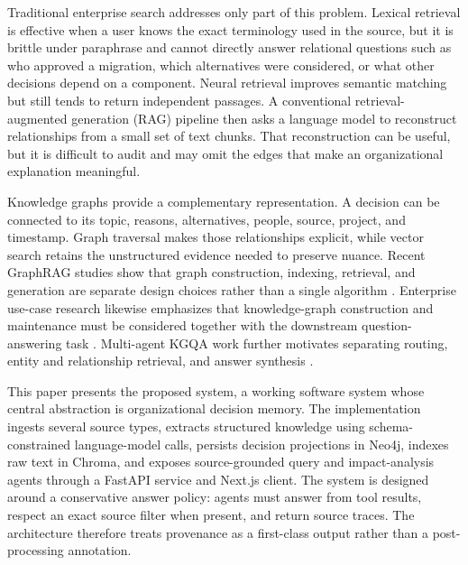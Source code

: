 \documentclass[conference]{IEEEtran}
\newcommand{\system}{the proposed system}
\begin{document}
Traditional enterprise search addresses only part of this problem. Lexical retrieval is effective when a user knows the exact terminology used in the source, but it is brittle under paraphrase and cannot directly answer relational questions such as who approved a migration, which alternatives were considered, or what other decisions depend on a component. Neural retrieval improves semantic matching but still tends to return independent passages. A conventional retrieval-augmented generation (RAG) pipeline then asks a language model to reconstruct relationships from a small set of text chunks. That reconstruction can be useful, but it is difficult to audit and may omit the edges that make an organizational explanation meaningful.

Knowledge graphs provide a complementary representation. A decision can be connected to its topic, reasons, alternatives, people, source, project, and timestamp. Graph traversal makes those relationships explicit, while vector search retains the unstructured evidence needed to preserve nuance. Recent GraphRAG studies show that graph construction, indexing, retrieval, and generation are separate design choices rather than a single algorithm \cite{zhou2025graph,han2025graphrag,cao2024lego}. Enterprise use-case research likewise emphasizes that knowledge-graph construction and maintenance must be considered together with the downstream question-answering task \cite{schneider2024enterprise,barros2024empwr}. Multi-agent KGQA work further motivates separating routing, entity and relationship retrieval, and answer synthesis \cite{nguyen2025scigent}.

This paper presents \system, a working software system whose central abstraction is organizational decision memory. The implementation ingests several source types, extracts structured knowledge using schema-constrained language-model calls, persists decision projections in Neo4j, indexes raw text in Chroma, and exposes source-grounded query and impact-analysis agents through a FastAPI service and Next.js client. The system is designed around a conservative answer policy: agents must answer from tool results, respect an exact source filter when present, and return source traces. The architecture therefore treats provenance as a first-class output rather than a post-processing annotation.
\end{document}
